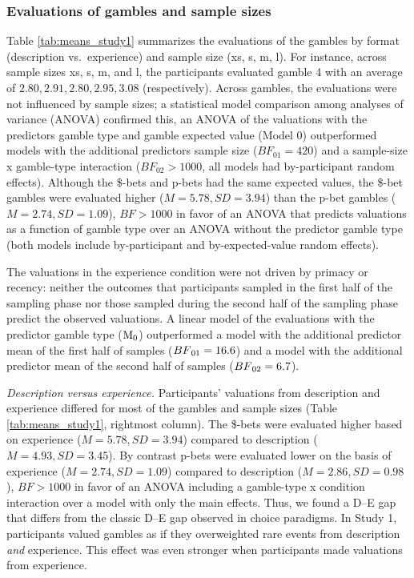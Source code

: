 \documentclass[a4paper, man, floatsintext]{apa6}
\title{}
\author{Jana B. Jarecki}
\date{06 Januar, 2020}
\begin{document}
\subsubsection{Evaluations of gambles and sample sizes}

Table \ref{tab:means_study1} summarizes the evaluations of the gambles
by format (description vs.~experience) and sample size (xs, s, m, l).
For instance, across sample sizes xs, s, m, and l, the participants
evaluated gamble 4 with an average of \(2.80, 2.91, 2.80, 2.95, 3.08\)
(respectively). Across gambles, the evaluations were not influenced by
sample sizes; a statistical model comparison among analyses of variance
(ANOVA) confirmed this, an ANOVA of the valuations with the predictors
gamble type and gamble expected value (Model 0) outperformed models with
the additional predictors sample size (\(BF_{01} = 420\)) and a
sample-size x gamble-type interaction (\(BF_{02} > 1000\), all models
had by-participant random effects). Although the \$-bets and p-bets had
the same expected values, the \$-bet gambles were evaluated higher
(\(M=5.78, SD=3.94\)) than the p-bet gambles (\(M=2.74, SD=1.09\)),
\(BF > 1000\) in favor of an ANOVA that predicts valuations as a
function of gamble type over an ANOVA without the predictor gamble type
(both models include by-participant and by-expected-value random
effects).

The valuations in the experience condition were not driven by primacy or
recency: neither the outcomes that participants sampled in the first
half of the sampling phase nor those sampled during the second half of
the sampling phase predict the observed valuations. A linear model of
the evaluations with the predictor gamble type
(\(\mathrm{M}\textsubscript{0}\)) outperformed a model with the
additional predictor mean of the first half of samples
(\(BF\textsubscript{01} = 16.6\)) and a model with the additional
predictor mean of the second half of samples
(\(BF\textsubscript{02} = 6.7\)).

\textit{Description versus experience.} Participants' valuations from
description and experience differed for most of the gambles and sample
sizes (Table \ref{tab:means_study1}, rightmost column). The \$-bets were
evaluated higher based on experience (\(M=5.78, SD=3.94\)) compared to
description (\(M=4.93, SD=3.45\)). By contrast p-bets were evaluated
lower on the basis of experience (\(M=2.74, SD=1.09\)) compared to
description (\(M=2.86, SD=0.98\)), \(BF > 1000\) in favor of an ANOVA
including a gamble-type x condition interaction over a model with only
the main effects. Thus, we found a D--E gap that differs from the
classic D--E gap observed in choice paradigms. In Study 1, participants
valued gambles as if they overweighted rare events from description
\textit{and} experience. This effect was even stronger when participants
made valuations from experience.
\end{document}
